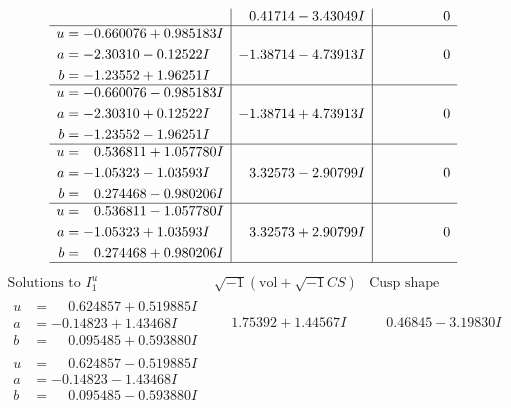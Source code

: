 \documentclass[1p]{elsarticle_modified}
\theoremstyle{definition}
\newcommand{\I}{\sqrt{-1}}
\begin{document}
$$\begin{array}{c|c|c}
 & \phantom{-}0.41714 - 3.43049 I & \phantom{-0.000000 } 0 \\ \hline\begin{aligned}
u &= -0.660076 + 0.985183 I \\
a &= -2.30310 - 0.12522 I \\
b &= -1.23552 + 1.96251 I\end{aligned}
 & -1.38714 - 4.73913 I & \phantom{-0.000000 } 0 \\ \hline\begin{aligned}
u &= -0.660076 - 0.985183 I \\
a &= -2.30310 + 0.12522 I \\
b &= -1.23552 - 1.96251 I\end{aligned}
 & -1.38714 + 4.73913 I & \phantom{-0.000000 } 0 \\ \hline\begin{aligned}
u &= \phantom{-}0.536811 + 1.057780 I \\
a &= -1.05323 - 1.03593 I \\
b &= \phantom{-}0.274468 - 0.980206 I\end{aligned}
 & \phantom{-}3.32573 - 2.90799 I & \phantom{-0.000000 } 0 \\ \hline\begin{aligned}
u &= \phantom{-}0.536811 - 1.057780 I \\
a &= -1.05323 + 1.03593 I \\
b &= \phantom{-}0.274468 + 0.980206 I\end{aligned}
 & \phantom{-}3.32573 + 2.90799 I & \phantom{-0.000000 } 0\\
 \hline 
 \end{array}$$\newpage$$\begin{array}{c|c|c}  
\text{Solutions to }I^u_{1}& \I (\text{vol} + \sqrt{-1}CS) & \text{Cusp shape}\\
 \hline 
\begin{aligned}
u &= \phantom{-}0.624857 + 0.519885 I \\
a &= -0.14823 + 1.43468 I \\
b &= \phantom{-}0.095485 + 0.593880 I\end{aligned}
 & \phantom{-}1.75392 + 1.44567 I & \phantom{-}0.46845 - 3.19830 I \\ \hline\begin{aligned}
u &= \phantom{-}0.624857 - 0.519885 I \\
a &= -0.14823 - 1.43468 I \\
b &= \phantom{-}0.095485 - 0.593880 I\end{aligned}

\end{array}$$
\end{document}
